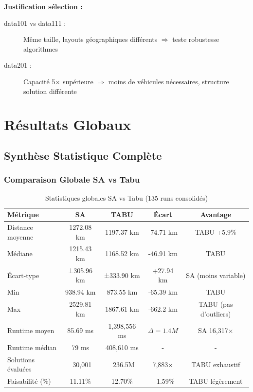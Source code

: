 \documentclass[12pt,a4paper,twoside]{report}
\begin{document}
\textbf{Justification sélection :}

\begin{description}
    \item[data101 vs data111 :] Même taille, layouts géographiques différents
          $\Rightarrow$ teste robustesse algorithmes
    \item[data201 :] Capacité 5× supérieure $\Rightarrow$ moins de véhicules nécessaires,
          structure solution différente
\end{description}

\chapter{Résultats Globaux}

\section{Synthèse Statistique Complète}

\subsection{Comparaison Globale SA vs Tabu}

\begin{table}[H]
    \centering
    \caption{Statistiques globales SA vs Tabu (135 runs consolidés)}
    \begin{tabular}{|l|c|c|c|c|}
        \hline
        \textbf{Métrique}  & \textbf{SA} & \textbf{TABU} & \textbf{Écart}  & \textbf{Avantage}     \\
        \hline
        Distance moyenne   & 1272.08 km  & 1197.37 km    & -74.71 km       & TABU +5.9\%           \\
        Médiane            & 1215.43 km  & 1168.52 km    & -46.91 km       & TABU                  \\
        Écart-type         & ±305.96 km  & ±333.90 km    & +27.94 km       & SA (moins variable)   \\
        Min                & 938.94 km   & 873.55 km     & -65.39 km       & TABU                  \\
        Max                & 2529.81 km  & 1867.61 km    & -662.2 km       & TABU (pas d'outliers) \\
        \hline
        Runtime moyen      & 85.69 ms    & 1,398,556 ms  & $\Delta = 1.4M$ & SA 16,317×            \\
        Runtime médian     & 79 ms       & 408,610 ms    & -               & -                     \\
        \hline
        Solutions évaluées & ~30,001     & ~236.5M       & 7,883×          & TABU exhaustif        \\
        Faisabilité (\%)   & 11.11\%     & 12.70\%       & +1.59\%         & TABU légèrement       \\
        \hline
    \end{tabular}
\end{table}
\end{document}
